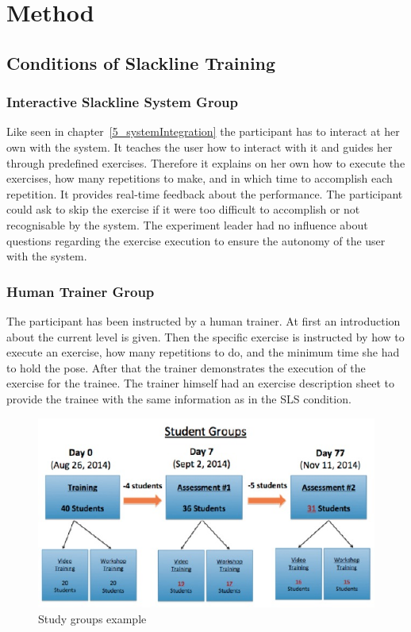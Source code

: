 \section{Method}

\subsection{Conditions of Slackline Training}
\subsubsection{Interactive Slackline System Group}
Like seen in chapter~\ref{5_systemIntegration} the participant has to interact at her own with the system. It teaches the user how to interact with it and guides her through predefined exercises. Therefore it explains on her own how to execute the exercises, how many repetitions to make, and in which time to accomplish each repetition. It provides real-time feedback about the performance. The participant could ask to skip the exercise if it were too difficult to accomplish or not recognisable by the system. The experiment leader had no influence about questions regarding the exercise execution to ensure the autonomy of the user with the system.

\subsubsection{Human Trainer Group}
The participant has been instructed by a human trainer. At first an introduction about the current level is given. Then the specific exercise is instructed by how to execute an exercise, how many repetitions to do, and the minimum time she had to hold the pose. After that the trainer demonstrates the execution of the exercise for the trainee. The trainer himself had an exercise description sheet to provide the trainee with the same information as in the SLS condition.
\begin{figure}[htb]
	\centering
	\begin{minipage}[t]{1\linewidth}
		\centering
		\includegraphics[width=0.8\linewidth]{Pictures/6_studyGroupsExample}
		\caption{Study groups example}
		\label{fig:6_studyGroups}
	\end{minipage}
\end{figure}

